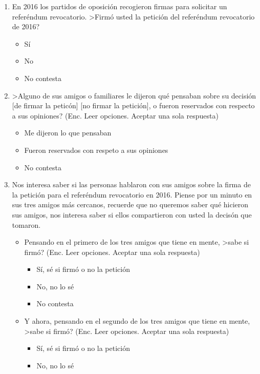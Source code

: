 \documentclass[12pt]{article}
\begin{document}
\begin{enumerate}
\item En 2016 los partidos de oposici\'{o}n recogieron firmas para solicitar un refer\'{e}ndum revocatorio. >Firm\'{o} usted la petici\'{o}n del refer\'{e}ndum revocatorio de 2016?
\begin{itemize}
\item S\'{i}
\item No
\item No contesta
\end{itemize}
\item >Alguno de sus amigos o familiares le dijeron qu\'{e} pensaban sobre su decisi\'{o}n [de firmar la petic\'{o}n] [no firmar la petici\'{o}n], o fueron reservados con respecto a sus opiniones? (Enc. Leer opciones. Aceptar una sola respuesta)
\begin{itemize}
\item Me dijeron lo que pensaban
\item Fueron reservados con respeto a sus opiniones
\item No contesta
\end{itemize}
\item Nos interesa saber si las personas hablaron con sus amigos sobre la firma de la petici\'{o}n para el refer\'{e}ndum revocatorio en 2016. Piense por un minuto en sus tres amigos m\'{a}s cercanos, recuerde que no queremos saber qu\'{e} hicieron sus amigos, nos interesa saber si ellos compartieron con usted la decis\'{o}n que tomaron.
\begin{itemize}
\item Pensando en el primero de los tres amigos que tiene en mente, >sabe si firm\'{o}? (Enc. Leer opciones. Aceptar una sola respuesta)
\begin{itemize}
\item S\'{i}, s\'{e} si firm\'{o} o no la petici\'{o}n
\item No, no lo s\'{e}
\item No contesta
\end{itemize}
\end{itemize}
\begin{itemize}
\item Y ahora, pensando en el segundo de los tres amigos que tiene en mente, >sabe si firm\'{o}? (Enc. Leer opciones. Aceptar una sola respuesta)
\begin{itemize}
\item S\'{i}, s\'{e} si firm\'{o} o no la petici\'{o}n
\item No, no lo s\'{e}

\end{itemize}
\end{itemize}
\end{enumerate}
\end{document}
